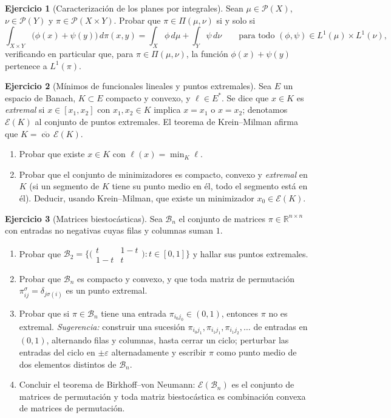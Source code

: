\documentclass[11pt,a4paper]{amsart}
\newcounter{chapter}
\newcommand{\ve}{\varepsilon}
\newcommand{\R}{{\mathbb R}}
\newcommand{\Ec}{{\mathcal E}}
\newcommand{\B}{{\mathcal B}}
\theoremstyle{remark}
\theoremstyle{definition}
\newtheorem{ejercicio}{Ejercicio}[chapter]
\numberwithin{subsection}{section}
\numberwithin{equation}{section}
\begin{document}
\begin{ejercicio}[Caracterización de los planes por integrales]\label{ejer.planes.integrales}
Sean $\mu\in\mathcal P(X)$, $\nu\in\mathcal P(Y)$ y $\pi\in\mathcal P(X\times Y)$.
Probar que $\pi\in\Pi(\mu,\nu)$ si y solo si
\[
\int_{X\times Y}\bigl(\phi(x)+\psi(y)\bigr)\,d\pi(x,y)
=\int_X\phi\,d\mu+\int_Y\psi\,d\nu
\qquad\text{para todo }(\phi,\psi)\in L^1(\mu)\times L^1(\nu),
\]
verificando en particular que, para $\pi\in\Pi(\mu,\nu)$, la función
$\phi(x)+\psi(y)$ pertenece a $L^1(\pi)$.
\end{ejercicio}

\begin{ejercicio}[Mínimos de funcionales lineales y puntos extremales]\label{ejer.krein.milman}
Sea $E$ un espacio de Banach, $K\subset E$ compacto y convexo, y
$\ell\in E^*$. Se dice que $x\in K$ es \emph{extremal} si
$x\in[x_1,x_2]$ con $x_1,x_2\in K$ implica $x=x_1$ o $x=x_2$; denotamos
$\Ec(K)$ al conjunto de puntos extremales. El teorema de Krein--Milman
afirma que $K=\overline{\operatorname{co}}\,\Ec(K)$.
\begin{enumerate}[label=(\alph*)]
\item Probar que existe $x\in K$ con $\ell(x)=\min_K\ell$.
\item Probar que el conjunto de minimizadores es compacto, convexo y
\emph{extremal} en $K$ (si un segmento de $K$ tiene su punto medio en él,
todo el segmento está en él). Deducir, usando Krein--Milman, que existe un
minimizador $x_0\in\Ec(K)$.
\end{enumerate}
\end{ejercicio}

\begin{ejercicio}[Matrices biestocásticas]\label{ejer.biestocasticas}
Sea $\B_n$ el conjunto de matrices $\pi\in\R^{n\times n}$ con entradas no
negativas cuyas filas y columnas suman $1$.
\begin{enumerate}[label=(\alph*)]
\item Probar que
$\B_2=\bigl\{\bigl(\begin{smallmatrix}t&1-t\\1-t&t\end{smallmatrix}\bigr):t\in[0,1]\bigr\}$
y hallar sus puntos extremales.
\item Probar que $\B_n$ es compacto y convexo, y que toda matriz de
permutación $\pi^\sigma_{ij}=\delta_{j\sigma(i)}$ es un punto extremal.
\item Probar que si $\pi\in\B_n$ tiene una entrada $\pi_{i_0j_0}\in(0,1)$,
entonces $\pi$ no es extremal. \emph{Sugerencia:} construir una sucesión
$\pi_{i_0j_1},\pi_{i_1j_1},\pi_{i_1j_2},\dots$ de entradas en $(0,1)$,
alternando filas y columnas, hasta cerrar un ciclo; perturbar las entradas
del ciclo en $\pm\ve$ alternadamente y escribir $\pi$ como punto medio de dos
elementos distintos de $\B_n$.
\item Concluir el teorema de Birkhoff--von Neumann: $\Ec(\B_n)$ es el
conjunto de matrices de permutación y toda matriz biestocástica es
combinación convexa de matrices de permutación.
\end{enumerate}
\end{ejercicio}
\end{document}
